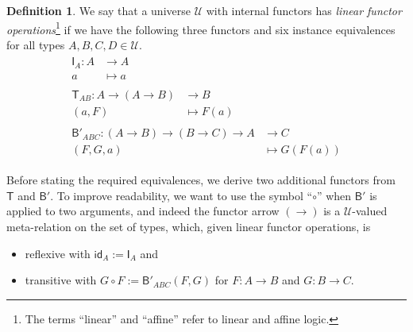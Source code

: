 \documentclass[a4paper]{article}
\theoremstyle{definition}
\newtheorem{definition}{Definition}[section]
\theoremstyle{remark}
\newcommand{\defn}{\emph}
\newcommand{\U}{\mathcal{U}}
\newcommand{\nm}{\mathsf}
\newcommand{\id}{\nm{id}}
\newcommand{\combinator}{\nm}
\newcommand{\idFun}{\combinator{I}}
\newcommand{\appFun}{\combinator{T}}
\newcommand{\compFun}{\combinator{B'}}
\begin{document}
\begin{definition}
  We say that a universe $\U$ with internal functors has \defn{linear functor
  operations}\footnote{The terms ``linear'' and ``affine'' refer to linear and affine logic.}
  if we have the following three functors and six instance equivalences for all types
  $A,B,C,D \in \U.$
  \vspace{1ex}
  \begin{gather*}
    \begin{aligned}
      \idFun_A : A &\to     A\\
                 a &\mapsto a
    \end{aligned}\\[1em]
    \begin{aligned}
      \appFun_{AB} : A \to (A \to B) &\to     B\\
                     (a,F)           &\mapsto F(a)
    \end{aligned}\\[1em]
    \begin{aligned}
      \compFun_{ABC} : (A \to B) \to (B \to C) \to A &\to     C\\
                       (F,G,a)                       &\mapsto G(F(a))
    \end{aligned}
  \end{gather*}

  Before stating the required equivalences, we derive two additional functors from $\appFun$
  and $\compFun.$
  To improve readability, we want to use the symbol ``$\circ$'' when $\compFun$ is applied to
  two arguments, and indeed the functor arrow $(\to)$ is a $\U$-valued meta-relation on the
  set of types, which, given linear functor operations, is
  \begin{itemize}
    \item reflexive with $\id_A := \idFun_A$ and
    \item transitive with $G \circ F := \compFun_{ABC}(F,G)$ for $F : A \to B$ and
    $G : B \to C.$
  \end{itemize}


\end{definition}
\end{document}
